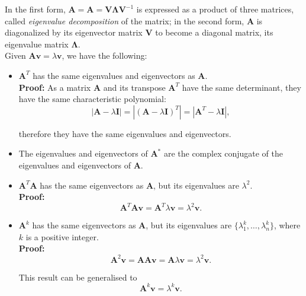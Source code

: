 \documentclass[10pt,b5paper,titlepage]{book}
\begin{document}
In the first form, $\mathbf{A} = \mathbf{A} = \mathbf{V}\mathbf{\Lambda{}}\mathbf{V}^{-1}$ is expressed as a product of three matrices, called \textit{eigenvalue decomposition} of the matrix; in the second form, $\mathbf{A}$ is diagonalized by its eigenvector matrix $\mathbf{V}$ to become a diagonal matrix, its eigenvalue matrix $\mathbf{\Lambda}$.\\

Given $\mathbf{A}\mathbf{v} = \lambda\mathbf{v}$, we have the following:
\begin{itemize}
\item $\mathbf{A}^{T}$ has the same eigenvalues and eigenvectors as $\mathbf{A}$.\\

\textbf{Proof:} As a matrix $\mathbf{A}$ and its transpose $\mathbf{A}^{T}$ have the same determinant, they have the same characteristic polynomial:
\begin{equation}
|\mathbf{A}-\lambda\mathbf{I}| = |(\mathbf{A}-\lambda\mathbf{I})^{T}| = |\mathbf{A}^{T}-\lambda\mathbf{I}|
,\end{equation}

therefore they have the same eigenvalues and eigenvectors.

\item The eigenvalues and eigenvectors of $\mathbf{A}^{*}$ are the complex conjugate of the eigenvalues and eigenvectors of $\mathbf{A}$.

\item $\mathbf{A}^{T}\mathbf{A}$ has the same eigenvectors as $\mathbf{A}$, but its eigenvalues are $\lambda^{2}$.\\

\textbf{Proof:}
\begin{equation}
\mathbf{A}^{T}\mathbf{A}\mathbf{v} = \mathbf{A}^{T}\lambda\mathbf{v} = \lambda^{2}\mathbf{v}
.\end{equation}


\item $\mathbf{A}^{k}$ has the same eigenvectors as $\mathbf{A}$, but its eigenvalues are $\{\lambda_{1}^{k},\dots,\lambda_{n}^{k}\}$, where $k$ is a positive integer.\\

\textbf{Proof:}
\begin{equation}
\mathbf{A}^{2}\mathbf{v} = \mathbf{A}\mathbf{A}\mathbf{v} = \mathbf{A}\lambda\mathbf{v} = \lambda^{2}\mathbf{v}
.\end{equation}

This result can be generalised to
\begin{equation}
\mathbf{A}^{k}\mathbf{v} = \lambda^{k}\mathbf{v}
.\end{equation}


\end{itemize}
\end{document}
